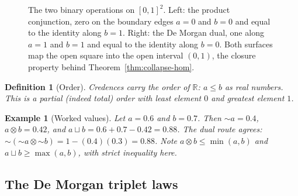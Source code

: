 \documentclass[11pt,a4paper]{article}
\newtheorem{definition}[theorem]{Definition}
\newtheorem{example}[theorem]{Example}
\newcommand{\negc}{\mathord{\sim}}
\newcommand{\conjc}{\otimes}
\newcommand{\disjc}{\sqcup}
\newcommand{\Real}{\mathbb{R}}
\begin{document}
\begin{figure}[ht]
\centering
{}
\hfill
{}
\caption{The two binary operations on $[0,1]^2$.
Left: the product conjunction, zero on the boundary edges
$a = 0$ and $b = 0$ and equal to the identity along $b = 1$.
Right: the De Morgan dual, one along $a = 1$ and $b = 1$ and equal to
the identity along $b = 0$.
Both surfaces map the open square into the open interval $(0,1)$,
the closure property behind Theorem~\ref{thm:collapse-hom}.}
\label{fig:surfaces}
\end{figure}

\begin{definition}[Order]
\label{def:order}
Credences carry the order of $\Real$: $a \leq b$ as real numbers.
This is a partial (indeed total) order with least element $0$ and
greatest element $1$.
\end{definition}

\begin{example}[Worked values]
\label{ex:values}
Let $a = 0.6$ and $b = 0.7$.
Then
$\negc a = 0.4$,
$a \conjc b = 0.42$, and
$a \disjc b = 0.6 + 0.7 - 0.42 = 0.88$.
The dual route agrees:
$\negc(\negc a \conjc \negc b) = 1 - (0.4)(0.3) = 0.88$.
Note $a \conjc b \leq \min(a,b)$ and
$a \disjc b \geq \max(a,b)$, with strict inequality here.
\end{example}

\subsection{The De Morgan triplet laws}
\end{document}
